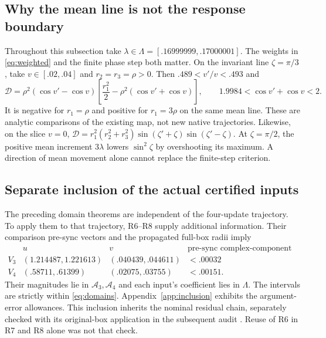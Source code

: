 \documentclass[11pt,a4paper]{article}
\numberwithin{equation}{section}
\begin{document}
\subsection{Why the mean line is not the response boundary}
Throughout this subsection take $\lambda\in\Lambda=[.16999999,.17000001]$.
The weights in \eqref{eq:weighted} and the finite phase step both matter.
On the invariant line $\zeta=\pi/3$, take $v\in[.02,.04]$ and
$r_2=r_3=\rho>0$. Then $.489<v'/v<.493$ and
\begin{equation}\label{eq:meanlineexample}
\mathcal D=\rho^2(\cos v'-\cos v)
\left[\frac{r_1^2}{2}-\rho^2(\cos v'+\cos v)\right],
\qquad 1.9984<\cos v'+\cos v<2.
\end{equation}
It is negative for $r_1=\rho$ and positive for $r_1=3\rho$ on the same
mean line. These are analytic comparisons of the existing map, not new
native trajectories. Likewise, on the slice $v=0$,
$\mathcal D=r_1^2(r_2^2+r_3^2)\sin(\zeta'+\zeta)\sin(\zeta'-\zeta)$.
At $\zeta=\pi/2$, the positive mean increment $3\lambda$ lowers $\sin^2\zeta$
by overshooting its maximum. A direction of mean movement alone cannot
replace the finite-step criterion.

\subsection{Separate inclusion of the actual certified inputs}\label{sec:inclusion}
The preceding domain theorems are independent of the four-update trajectory.
To apply them to that trajectory, R6--R8 supply additional information.
Their comparison pre-sync vectors and the propagated full-box radii imply
\begin{equation}\label{eq:actualphase}
\begin{array}{c|cc|c}
&u&v&\text{pre-sync complex-component radius}\\ \hline
V_3&(1.214487,1.221613)&(.040439,.044611)&<.00032\\
V_4&(.58711,.61399)&(.02075,.03755)&<.00151 .
\end{array}
\end{equation}
Their magnitudes lie in $\mathcal A_3,\mathcal A_4$ and each input's
coefficient lies in $\Lambda$. The intervals are strictly within
\eqref{eq:domains}. Appendix~\ref{app:inclusion} exhibits the argument-error
allowances. This inclusion inherits the nominal residual chain, separately
checked with its original-box application in the subsequent audit
\cite{Audit,GPTAudit}. Reuse of R6 in R7 and R8 alone was not that check.
\end{document}
